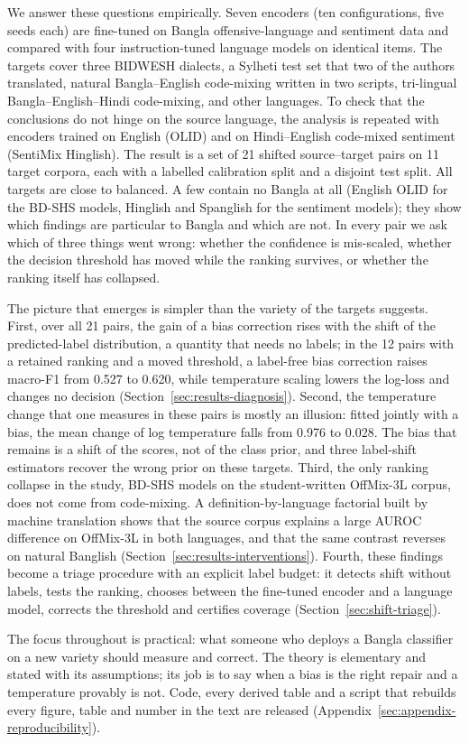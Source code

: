 We answer these questions empirically. Seven encoders (ten configurations, five seeds each) are fine-tuned on Bangla
offensive-language and sentiment data and compared with four instruction-tuned language models on identical items.
The targets cover three BIDWESH dialects, a Sylheti test set that two of the authors translated, natural
Bangla--English code-mixing written in two scripts, tri-lingual Bangla--English--Hindi code-mixing, and other
languages. To check that the conclusions do not hinge on the source language, the analysis is repeated with encoders
trained on English (OLID) and on Hindi--English code-mixed sentiment (SentiMix Hinglish). The result is a set of 21
shifted source--target pairs on 11 target corpora, each with a labelled calibration split and a disjoint test split.
All targets are close to balanced. A few contain no Bangla at all (English OLID for the BD-SHS models, Hinglish and
Spanglish for the sentiment models); they show which findings are particular to Bangla and which are not.
In every pair we ask which of three things went wrong: whether the confidence is mis-scaled, whether the decision
threshold has moved while the ranking survives, or whether the ranking itself has collapsed.

The picture that emerges is simpler than the variety of the targets suggests. First, over all 21 pairs, the gain of
a bias correction rises with the shift of the predicted-label distribution, a quantity that needs no labels; in the
12 pairs with a retained ranking and a moved threshold, a label-free bias correction raises macro-F1 from 0.527 to
0.620, while temperature scaling lowers the log-loss and changes no decision (Section~\ref{sec:results-diagnosis}).
Second, the temperature change that one measures in these pairs is mostly an illusion: fitted jointly with a bias, the
mean change of log temperature falls from 0.976 to 0.028. The bias that remains is a shift of the scores, not of the
class prior, and three label-shift estimators recover the wrong prior on these targets. Third, the only ranking
collapse in the study, BD-SHS models on the student-written OffMix-3L corpus, does not come from code-mixing. A
definition-by-language factorial built by machine translation shows that the source corpus explains a large AUROC
difference on OffMix-3L in both languages, and that the same contrast reverses on natural Banglish
(Section~\ref{sec:results-interventions}). Fourth, these findings become a triage procedure with an explicit label
budget: it detects shift without labels, tests the ranking, chooses between the fine-tuned encoder and a language
model, corrects the threshold and certifies coverage (Section~\ref{sec:shift-triage}).

The focus throughout is practical: what someone who deploys a Bangla classifier on a new variety should measure and
correct. The theory is elementary and stated with its assumptions; its job is to say when a bias is the right repair
and a temperature provably is not. Code, every derived table and a script that rebuilds every figure, table and number
in the text are released (Appendix~\ref{sec:appendix-reproducibility}).

